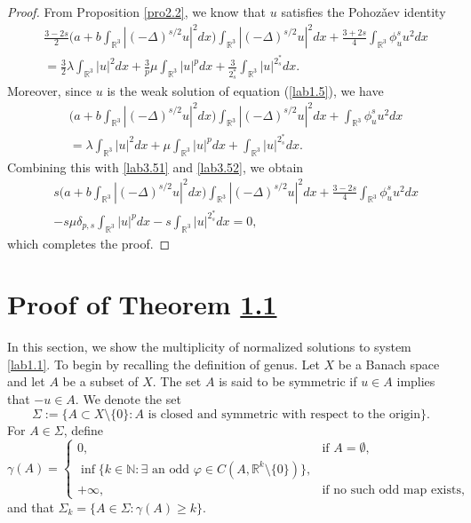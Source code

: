 \documentclass[11pt]{article}
\numberwithin{equation}{section}
\begin{document}
\begin{proof}
From Proposition \ref{pro2.2}, we know that $u$ satisfies the Pohoz\v{a}ev identity
\begin{equation}\label{lab3.51}
\begin{split}
&\frac{3-2s}{2}\Big(a+b\int_{\mathbb{R}^3}|(-\Delta)^{s/2}u|^2dx\Big)
 \int_{\mathbb{R}^3}|(-\Delta)^{s/2}u|^2dx
 +\frac{3+2s}{4}\int_{\mathbb{R}^3}\phi^s_u u^2dx\\
&=\frac{3}{2}\lambda \int_{\mathbb{R}^3}|u|^2dx
 + \frac{3}{p}\mu \int_{\mathbb{R}^3}|u|^pdx
 +\frac{3}{2^*_s}\int_{\mathbb{R}^3}|u|^{2^*_s}dx.
\end{split}
\end{equation}
Moreover, since $u$ is the weak solution of equation ({\ref{lab1.5}}), we have
\begin{equation}\label{lab3.52}
\begin{split}
&\Big(a+b\int_{\mathbb{R}^3}|(-\Delta)^{s/2}u|^2dx\Big)
 \int_{\mathbb{R}^3}|(-\Delta)^{s/2}u|^2dx
 +\int_{\mathbb{R}^3}\phi^s_u u^2dx\\
&=\lambda \int_{\mathbb{R}^3}|u|^2dx+\mu \int_{\mathbb{R}^3}|u|^pdx
 +\int_{\mathbb{R}^3}|u|^{2^*_s}dx.
\end{split}
\end{equation}
Combining this with \eqref{lab3.51} and \eqref{lab3.52}, we obtain
\begin{align*}
&s\Big(a+b\int_{\mathbb{R}^3}|(-\Delta)^{s/2}u|^2dx\Big)
 \int_{\mathbb{R}^3}|(-\Delta)^{s/2}u|^2dx
 +\frac{3-2s}{4}\int_{\mathbb{R}^3}\phi^s_u u^2dx\\
&-s\mu \delta_{p,s}\int_{\mathbb{R}^3}|u|^pdx-s\int_{\mathbb{R}^3}|u|^{2^*_s}dx=0,
\end{align*}
which completes the proof.
\end{proof}

\section{Proof of Theorem \href{https://doi.org/10.58997/ejde.2026.03}{1.1}}
In this section, we show the multiplicity of normalized solutions to  system \eqref{lab1.1}.
To begin by recalling the definition of genus.
Let $X$ be a Banach space and let $A$ be a subset of $X$. The set $A$ is said to be
symmetric if $u\in A$ implies that $-u\in A$. We denote the set
$$
\Sigma :=\{A\subset X\setminus \{0\}: A \text{ is closed and symmetric with respect
 to the origin}\}.
$$
For $A\in\Sigma$, define
\[
\gamma(A) =
\begin{cases}
0, & \text{if } A = \emptyset, \\
\inf\{k \in \mathbb{N}: \exists \text{ an odd }
\varphi \in C(A, \mathbb{R}^k \setminus \{0\})\}, \\
+\infty,& \text{if no such odd map exists,}
\end{cases}
\]
and that $\Sigma_k=\{A\in \Sigma:\gamma(A)\geq k\}$.
\end{document}
